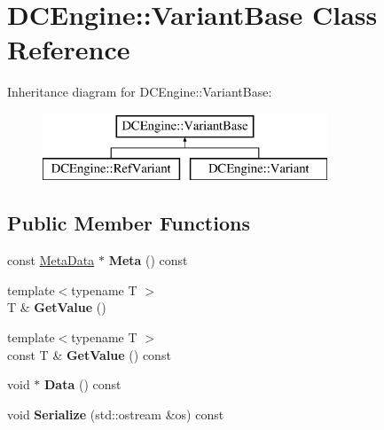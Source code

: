 \hypertarget{classDCEngine_1_1VariantBase}{\section{D\-C\-Engine\-:\-:Variant\-Base Class Reference}
\label{classDCEngine_1_1VariantBase}
}
Inheritance diagram for D\-C\-Engine\-:\-:Variant\-Base\-:\begin{figure}[H]
\begin{center}
\leavevmode
\includegraphics[height=2.000000cm]{classDCEngine_1_1VariantBase}
\end{center}
\end{figure}
\subsection*{Public Member Functions}
\begin{DoxyCompactItemize}
\item 
\hypertarget{classDCEngine_1_1VariantBase_a0dba9715d1199a2b9e814d382fd21255}{const \hyperlink{classDCEngine_1_1MetaData}{Meta\-Data} $\ast$ {\bfseries Meta} () const }\label{classDCEngine_1_1VariantBase_a0dba9715d1199a2b9e814d382fd21255}

\item 
\hypertarget{classDCEngine_1_1VariantBase_ac0d941320ee9bef768a82d9ef84b2ad3}{{\footnotesize template$<$typename T $>$ }\\T \& {\bfseries Get\-Value} ()}\label{classDCEngine_1_1VariantBase_ac0d941320ee9bef768a82d9ef84b2ad3}

\item 
\hypertarget{classDCEngine_1_1VariantBase_a8c59080f9a19fb0fd01c87feb235ec1e}{{\footnotesize template$<$typename T $>$ }\\const T \& {\bfseries Get\-Value} () const }\label{classDCEngine_1_1VariantBase_a8c59080f9a19fb0fd01c87feb235ec1e}

\item 
\hypertarget{classDCEngine_1_1VariantBase_a1ed1e8b513682ff9d20a336b1e42c2d3}{void $\ast$ {\bfseries Data} () const }\label{classDCEngine_1_1VariantBase_a1ed1e8b513682ff9d20a336b1e42c2d3}

\item 
\hypertarget{classDCEngine_1_1VariantBase_a46bf5aa7cd25394e85111978a1bd66b2}{void {\bfseries Serialize} (std\-::ostream \&os) const }\label{classDCEngine_1_1VariantBase_a46bf5aa7cd25394e85111978a1bd66b2}

\end{DoxyCompactItemize}
